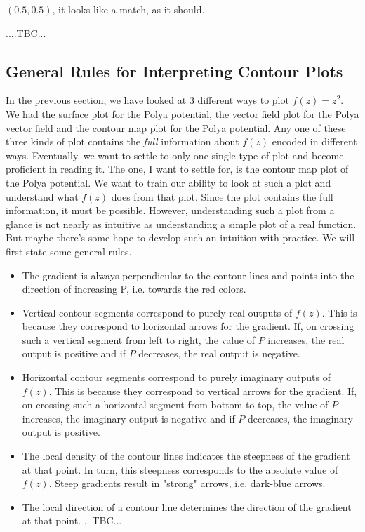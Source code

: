 \documentclass[12pt]{article}
\begin{document}
$(0.5,0.5)$, it looks like a match, as it should.

....TBC...

\subsection{General Rules for Interpreting Contour Plots}
In the previous section, we have looked at 3 different ways to plot $f(z) = z^2$. We had the surface plot for the Polya potential, the vector field plot for the Polya vector field and the contour map plot for the Polya potential. Any one of these three kinds of plot contains the \emph{full} information about $f(z)$ encoded in different ways. Eventually, we want to settle to only one single type of plot and become proficient in reading it. The one, I want to settle for, is the contour map plot of the Polya potential. We want to train our ability to look at such a plot and understand what $f(z)$ does from that plot. Since the plot contains the full information, it must be possible. However, understanding such a plot from a glance is not nearly as intuitive as understanding a simple plot of a real function. But maybe there's some hope to develop such an intuition with practice. We will first state some general rules.

\begin{itemize}
\item The gradient is always perpendicular to the contour lines and points into the direction of increasing P, i.e. towards the red colors.
\item Vertical contour segments correspond to purely real outputs of $f(z)$. This is because they correspond to horizontal arrows for the gradient. If, on crossing such a vertical segment from left to right, the value of $P$ increases, the real output is positive and if $P$ decreases, the real output is negative.
\item Horizontal contour segments correspond to purely imaginary outputs of $f(z)$. This is because they correspond to vertical arrows for the gradient. If, on crossing such a horizontal segment from bottom to top, the value of $P$ increases, the imaginary output is negative and if $P$ decreases, the imaginary output is positive.
\item The local density of the contour lines indicates the steepness of the gradient at that point. In turn, this steepness corresponds to the absolute value of $f(z)$. Steep gradients result in "strong" arrows, i.e. dark-blue arrows.
\item The local direction of a contour line determines the direction of the gradient at that point. ...TBC...
\end{itemize}
\end{document}
